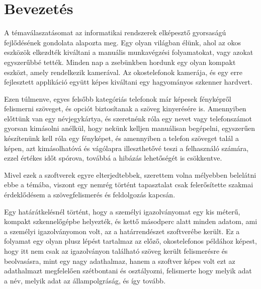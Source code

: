 \documentclass[12pt]{report}
\begin{document}


\tableofcontents

\chapter{Bevezetés}
A témaválaszatásomat az informatikai rendszerek elképesztő gyorsaságú fejlődésének gondolata alapozta meg. Egy olyan világban élünk, ahol az okos eszközök elkezdték kiváltani a manuális munkavégzési folyamatokat, vagy azokat egyszerűbbé tették. Minden nap a zsebünkben hordunk egy olyan kompakt eszközt, amely rendelkezik kamerával. Az okostelefonok kamerája, és egy erre fejlesztett applikáció együtt képes kiváltani egy hagyományos szkenner hardvert.

Ezen túlmenve, egyes felsőbb kategóriás telefonok már képesek fényképről felismerni szöveget, és opciót biztosítanak a szöveg kinyerésére is. Amennyiben előttünk van egy névjegykártya, és szeretnénk róla egy nevet vagy telefonszámot gyorsan kimásolni anélkül, hogy nekünk kelljen manuálisan begépelni, egyszerűen készítenünk kell róla egy fényképet, és amennyiben a telefon szöveget talál a képen, azt kimásolhatóvá és vágólapra illeszthetővé teszi a felhasználó számára, ezzel értékes időt spórova, továbbá a hibázás lehetőségét is csökkentve.

Mivel ezek a szoftverek egyre elterjedtebbek, szerettem volna mélyebben belelátni ebbe a témába, viszont egy nemrég történt tapasztalat csak felerősítette szakmai érdeklődésem a szövegfelismerés és feldolgozás kapcsán. 

Egy határátkelésnél történt, hogy a személyi igazolványomat egy kis méterű, kompakt szkennelőgépbe helyezték, és kettő másodperc alatt minden adatom, ami a személyi igazolványomon volt, az a határrendészet szoftverébe került. Ez a folyamat egy olyan plusz lépést tartalmaz az előző, okostelefonos példához képest, hogy itt nem csak az igazolványon található szöveg került felismerésre és beolvasásra, mint egy nagy adathalmaz, hanem a szoftver képes volt ezt az adathalmazt megfelelően szétbontani és osztályozni, felismerte hogy melyik adat a név, melyik adat az állampolgráság, és így tovább.
\end{document}
